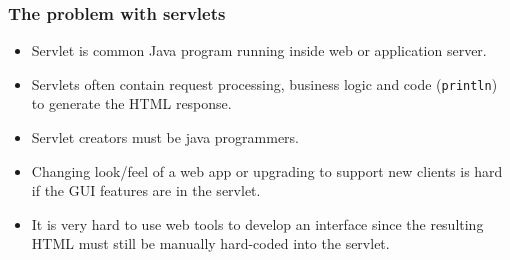 \documentclass[10pt,xcolor=pdflatex]{beamer}
\begin{document}
\begin{frame}\frametitle{The problem with servlets}
	\begin{itemize}
        \item Servlet is common Java program running inside web or application server.
    	\item Servlets often contain request processing, business logic and code (\texttt{println}) to generate the HTML response.
		\item Servlet creators must be java programmers.
		\item Changing look/feel of a web app or upgrading to support new clients is hard if the GUI features are in the servlet.
		\item It is very hard to use web tools to develop an interface since the resulting HTML must still be manually hard-coded into the servlet.
    \end{itemize}
\end{frame}
\end{document}
